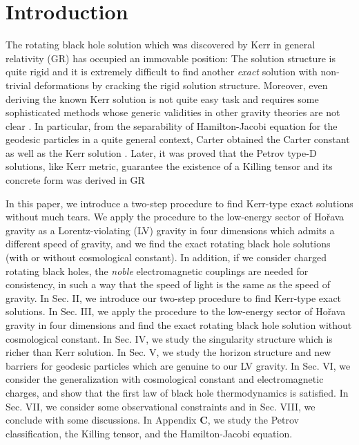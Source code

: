 \documentclass[preprint,aps,tightenlines,showkeys,nofootinbib,superscriptaddress]{revtex4}
\begin{document}
\maketitle

\newpage

\section{Introduction}

The rotating black hole solution which was discovered by Kerr \cite{Kerr:1963} in general relativity (GR) has occupied an immovable position: The solution structure is quite rigid and it is extremely difficult to find another {\it exact} solution with non-trivial deformations by cracking the rigid solution structure. Moreover, even deriving the known Kerr solution is not quite easy task and requires some sophisticated methods whose generic validities in other gravity theories are not clear \cite{Chan:1985}.
In particular, from the separability of Hamilton-Jacobi equation for the geodesic particles in a quite general context, Carter obtained the Carter constant as well as the Kerr solution \cite{Cart:1973}. Later, it was proved that the Petrov type-D solutions, like Kerr metric, guarantee the existence of a Killing tensor and its concrete form was derived in GR \cite{Walk:1970}

In this paper, we introduce a two-step procedure to find Kerr-type exact solutions without much tears. We apply the procedure
to the low-energy sector of Ho\v{r}ava gravity as a Lorentz-violating (LV)
gravity in four dimensions which admits a different speed
of gravity, and
we find the exact rotating black hole solutions (with or without cosmological constant). In addition, if we consider charged rotating black holes, the {\it noble} electromagnetic couplings are needed for consistency, in such a way that the speed of light is the same as the speed of gravity. In Sec. II, we introduce our two-step procedure to find Kerr-type exact solutions. In Sec. III, we apply the procedure to the low-energy sector of Ho\v{r}ava gravity in four dimensions and find the exact rotating black hole solution without cosmological constant. In Sec. IV, we study the singularity structure which is richer than Kerr solution. In Sec. V, we study the horizon structure and new barriers for geodesic particles which are genuine to our LV gravity. In Sec. VI, we consider the generalization with cosmological constant and electromagnetic charges, and
show that the first law of black hole thermodynamics is satisfied. In Sec. VII, we consider some observational constraints and in Sec. VIII, we conclude with some discussions.
In Appendix {\bf C}, we study the Petrov classification,
the Killing tensor, and the Hamilton-Jacobi equation.
\end{document}
